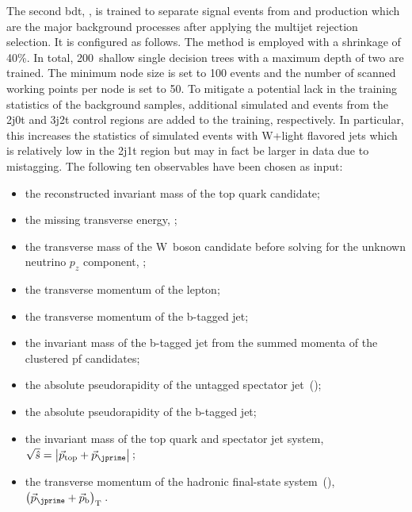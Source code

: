 The second \gls{bdt}, \bdttch, is trained to separate signal events from \wjets and \ttbar production which are the major background processes after applying the multijet rejection selection. It is configured as follows. The \GRADIENTBOOST method is employed with a shrinkage of 40\%. In total, 200~shallow single decision trees with a maximum depth of two are trained. The minimum node size is set to 100 events and the number of scanned working points per node is set to 50. To mitigate a potential lack in the training statistics of the background samples, additional simulated \wjets and \ttbar events from the 2j0t and 3j2t control regions are added to the training, respectively. In particular, this increases the statistics of simulated events with W+light flavored jets which is relatively low in the 2j1t region but may in fact be larger in data due to mistagging. The following ten observables have been chosen as input:

\begin{itemize}
\item the reconstructed invariant mass of the top quark candidate;
\item the missing transverse energy, \met;
\item the transverse mass of the W~boson candidate before solving for the unknown neutrino $p_{z}$ component, \mtw;
\item the transverse momentum of the lepton;
\item the transverse momentum of the b-tagged jet;
\item the invariant mass of the b-tagged jet from the summed momenta of the clustered \gls{pf} candidates;
\item the absolute pseudorapidity of the untagged spectator jet~(\jprime);
\item the absolute pseudorapidity of the b-tagged jet;
\item the invariant mass of the top quark and spectator jet system, $\sqrt{\hat{s}}=\big|\vec{p}_{\mathrm{top}}+\vec{p}_{\jprime}\big|$\,;
\item the transverse momentum of the hadronic final-state system~(), $\big(\vec{p}_{\jprime}+\vec{p}_{\mathrm{b}}\big)_\mathrm{T}$\,.
\end{itemize}

